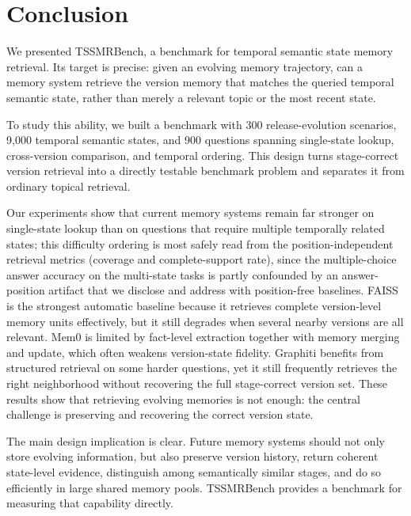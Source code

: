 \section{Conclusion}

We presented TSSMRBench, a benchmark for temporal semantic state memory retrieval. Its target is precise: given an evolving memory trajectory, can a memory system retrieve the version memory that matches the queried temporal semantic state, rather than merely a relevant topic or the most recent state.

To study this ability, we built a benchmark with 300 release-evolution scenarios, 9{,}000 temporal semantic states, and 900 questions spanning single-state lookup, cross-version comparison, and temporal ordering. This design turns stage-correct version retrieval into a directly testable benchmark problem and separates it from ordinary topical retrieval.

Our experiments show that current memory systems remain far stronger on single-state lookup than on questions that require multiple temporally related states; this difficulty ordering is most safely read from the position-independent retrieval metrics (coverage and complete-support rate), since the multiple-choice answer accuracy on the multi-state tasks is partly confounded by an answer-position artifact that we disclose and address with position-free baselines. FAISS is the strongest automatic baseline because it retrieves complete version-level memory units effectively, but it still degrades when several nearby versions are all relevant. Mem0 is limited by fact-level extraction together with memory merging and update, which often weakens version-state fidelity. Graphiti benefits from structured retrieval on some harder questions, yet it still frequently retrieves the right neighborhood without recovering the full stage-correct version set. These results show that retrieving evolving memories is not enough: the central challenge is preserving and recovering the correct version state.

The main design implication is clear. Future memory systems should not only store evolving information, but also preserve version history, return coherent state-level evidence, distinguish among semantically similar stages, and do so efficiently in large shared memory pools. TSSMRBench provides a benchmark for measuring that capability directly.
